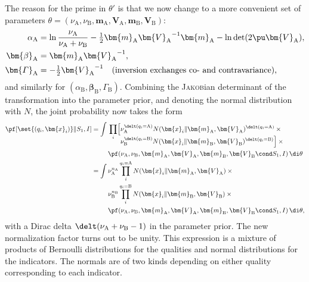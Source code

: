 \documentclass[10pt,%
onecolumn,oneside,a5paper,article,frenchb,italian,german,swedish,latin,british%
]{memoir}
\newcommand*{\half}{\tfrac{1}{2}}
\newcommand*{\yI}{I}
\newcommand*{\yS}{S}
\newcommand*{\yh}{q}
\newcommand*{\bx}{\bm{x}}
\newcommand*{\ya}{\textrm{A}}
\newcommand*{\yb}{\textrm{B}}
\newcommand*{\yna}{n_{\ya}}
\newcommand*{\ynb}{n_{\yb}}
\newcommand*{\yla}{\alpha_{\ya}}
\newcommand*{\ylb}{\alpha_{\yb}}
\newcommand*{\yma}{\bm{\beta}_{\ya}}
\newcommand*{\ymb}{\bm{\beta}_{\yb}}
\newcommand*{\ymma}{\bm{\varGamma}_{\ya}}
\newcommand*{\ymmb}{\bm{\varGamma}_{\yb}}
\newcommand*{\yfa}{\nu_{\ya}}
\newcommand*{\yfb}{\nu_{\yb}}
\newcommand*{\yca}{\bm{m}_{\ya}}
\newcommand*{\ycb}{\bm{m}_{\yb}}
\newcommand*{\yssa}{\bm{V}_{\ya}}
\newcommand*{\yssb}{\bm{V}_{\yb}}
\newcommand*{\yth}{\theta}
\newcommand*{\yN}{N}
\begin{document}
The reason for the prime in $\yth'$ is that we now change to a more
convenient set of parameters $\yth=(\yfa,\yfb,\yca,\yssa,\ycb,\yssb)$:
\begin{equation}
  \label{eq:new_params}
  \begin{split}
    \yla &= \ln\frac{\yfa}{\yfa+\yfb} - \half\yca{\yssa}^{-1}\yca
    - \ln\det(2\pu\yssa),\\
    \yma &= \yca{\yssa}^{-1},\\
    \ymma &= -\half{\yssa}^{-1}
    \quad\text{(inversion exchanges co- and contravariance),}
  \end{split}
\end{equation}
and similarly for $(\ylb, \ymb, \ymmb)$. Combining the \textsc{Jakob}ian
determinant of the transformation into the parameter prior, and denoting
the normal distribution with $\yN$, the joint probability now takes the
form
\begin{equation}
  \label{eq:P_integral_exp_S1_final}
  \begin{split}
    \pf[\set{(\yh_i,\bx_i)} \| \yS_1, \yI]&=\int \!\begin{aligned}[t]
      &\prod_i\Bigl[ \!\begin{aligned}[t]
        &\yfa^{\delt(\yh_i=\ya)} \yN(\bx_i \| \yca,\yssa)^{\delt(\yh_i=\ya)}\times{}\\
        &\yfb^{\delt(\yh_i=\yb)} \yN(\bx_i
        \|\ycb,\yssb)^{\delt(\yh_i=\yb)} \Bigr] \times{}
      \end{aligned}\\
      &\pf(\yfa,\yfb,\yca,\yssa,\ycb,\yssb\cond \yS_1,\yI)\, \di\yth
    \end{aligned}
    \\
    &=\int
    \!\begin{aligned}[t]
      &\yfa^{\yna} \prod_i^{\yh_i=\ya}\yN(\bx_i \| \yca,\yssa)\times{}\\
      &\yfb^{\ynb} \prod_i^{\yh_i=\yb}\yN(\bx_i \| \ycb,\yssb)\times{}\\
      &\pf(\yfa,\yfb,\yca,\yssa,\ycb,\yssb\cond \yS_1,\yI)\, \di\yth,
    \end{aligned}
  \end{split}
\end{equation}
with a Dirac delta $\delt(\yfa+\yfb-1)$ in the parameter prior. The new
normalization factor turns out to be unity. This expression is a mixture of
products of Bernoulli distributions for the qualities and normal
distributions for the indicators. The normals are of two kinds depending on
either quality corresponding to each indicator.
\end{document}
